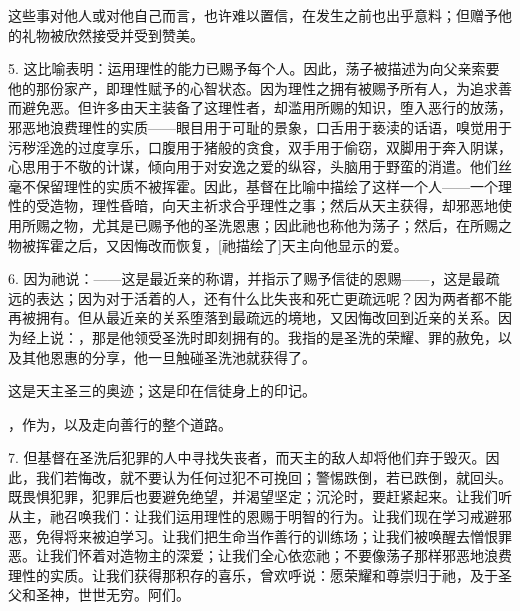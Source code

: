 这些事对他人或对他自己而言，也许难以置信，在发生之前也出乎意料；但赠予他的礼物被欣然接受并受到赞美。\par

5. 这比喻表明：运用理性的能力已赐予每个人。因此，荡子被描述为向父亲索要他的那份家产，即理性赋予的心智状态。因为理性之拥有被赐予所有人，为追求善而避免恶。但许多由天主装备了这理性者，却滥用所赐的知识，堕入恶行的放荡，邪恶地浪费理性的实质——眼目用于可耻的景象，口舌用于亵渎的话语，嗅觉用于污秽淫逸的过度享乐，口腹用于猪般的贪食，双手用于偷窃，双脚用于奔入阴谋，心思用于不敬的计谋，倾向用于对安逸之爱的纵容，头脑用于野蛮的消遣。他们丝毫不保留理性的实质不被挥霍。因此，基督在比喻中描绘了这样一个人——一个理性的受造物，理性昏暗，向天主祈求合乎理性之事；然后从天主获得，却邪恶地使用所赐之物，尤其是已赐予他的圣洗恩惠；因此祂也称他为荡子；然后，在所赐之物被挥霍之后，又因悔改而恢复，[祂描绘了]天主向他显示的爱。\par

6. 因为祂说：——这是最近亲的称谓，并指示了赐予信徒的恩赐——，这是最疏远的表达；因为对于活着的人，还有什么比失丧和死亡更疏远呢？因为两者都不能再被拥有。但从最近亲的关系堕落到最疏远的境地，又因悔改回到近亲的关系。因为经上说：，那是他领受圣洗时即刻拥有的。我指的是圣洗的荣耀、罪的赦免，以及其他恩惠的分享，他一旦触碰圣洗池就获得了。\par

这是天主圣三的奥迹；这是印在信徒身上的印记。\par

，作为，以及走向善行的整个道路。\par

7. 但基督在圣洗后犯罪的人中寻找失丧者，而天主的敌人却将他们弃于毁灭。因此，我们若悔改，就不要认为任何过犯不可挽回；警惕跌倒，若已跌倒，就回头。既畏惧犯罪，犯罪后也要避免绝望，并渴望坚定；沉沦时，要赶紧起来。让我们听从主，祂召唤我们：让我们运用理性的恩赐于明智的行为。让我们现在学习戒避邪恶，免得将来被迫学习。让我们把生命当作善行的训练场；让我们被唤醒去憎恨罪恶。让我们怀着对造物主的深爱；让我们全心依恋祂；不要像荡子那样邪恶地浪费理性的实质。让我们获得那积存的喜乐，曾欢呼说：愿荣耀和尊崇归于祂，及于圣父和圣神，世世无穷。阿们。\par

